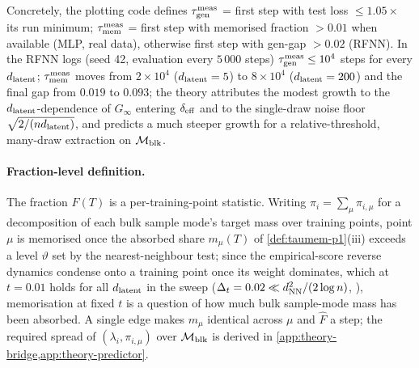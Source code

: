 \noindent Concretely, the plotting code defines $\tau_{\mathrm{gen}}^{\rm meas}$ = first step with test loss $\le1.05\times$ its run minimum; $\tau_{\mathrm{mem}}^{\rm meas}$ = first step with memorised fraction $>0.01$ when available (MLP, real data), otherwise first step with gen-gap $>0.02$ (RFNN). In the RFNN logs (seed 42, evaluation every $5\,000$ steps) $\tau_{\mathrm{gen}}^{\rm meas}\le10^4$ steps for every $d_{\mathrm{latent}}$; $\tau_{\mathrm{mem}}^{\rm meas}$ moves from $2\times10^4$ ($d_{\mathrm{latent}}=5$) to $8\times10^4$ ($d_{\mathrm{latent}}=200$) and the final gap from $0.019$ to $0.093$; the theory attributes the modest growth to the $d_{\mathrm{latent}}$-dependence of $G_\infty$ entering $\delta_{\rm eff}$ and to the single-draw noise floor $\sqrt{2/(nd_{\mathrm{latent}})}$, and predicts a much steeper growth for a relative-threshold, many-draw extraction on $\mathcal M_{\rm blk}$.

\paragraph{Fraction-level definition.}
The fraction $F(T)$ is a per-training-point statistic. Writing $\pi_i=\sum_\mu\pi_{i,\mu}$ for a decomposition of each bulk sample mode's target mass over training points, point $\mu$ is memorised once the absorbed share $m_\mu(T)$ of \cref{def:taumem-p1}(iii) exceeds a level $\vartheta$ set by the nearest-neighbour test; since the empirical-score reverse dynamics condense onto a training point once its weight dominates, which at $t=0.01$ holds for all $d_{\mathrm{latent}}$ in the sweep ($\Delta_t=0.02\ll d_{\rm NN}^2/(2\log n)$, \citealp{biroli2024dynamical}), memorisation at fixed $t$ is a question of how much bulk sample-mode mass has been absorbed. A single edge makes $m_\mu$ identical across $\mu$ and $\hat F$ a step; the required spread of $(\lambda_i,\pi_{i,\mu})$ over $\mathcal M_{\rm blk}$ is derived in \cref{app:theory-bridge,app:theory-predictor}.

